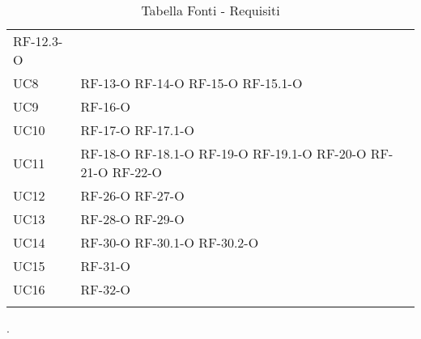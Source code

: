 \begin{longtable}{ 
		>{}p{} 
		>{}p{} }
	RF-12.3-O	\tabularnewline
UC8 &
	RF-13-O		\newline
	RF-14-O		\newline
	RF-15-O		\newline
	RF-15.1-O	\tabularnewline
UC9 &
	RF-16-O		\tabularnewline
UC10 &
	RF-17-O		\newline
	RF-17.1-O	\tabularnewline
UC11 &
	RF-18-O		\newline
	RF-18.1-O	\newline
	RF-19-O		\newline
	RF-19.1-O	\newline
	RF-20-O		\newline
	RF-21-O		\newline
	RF-22-O		\tabularnewline
UC12 &
	RF-26-O		\newline
	RF-27-O		\tabularnewline
UC13 &
	RF-28-O		\newline
	RF-29-O		\tabularnewline
UC14 &
	RF-30-O		\newline
	RF-30.1-O	\newline
	RF-30.2-O	\tabularnewline
UC15 &
	RF-31-O		\tabularnewline
UC16 &
	RF-32-O		\tabularnewline
\caption{Tabella Fonti - Requisiti\label{ Tabella Fonti - Requisiti}}
\end{longtable}.
